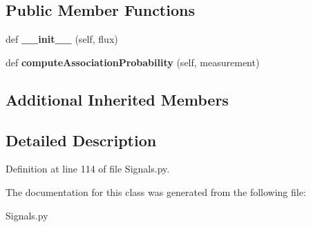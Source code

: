 \subsection*{Public Member Functions}
\begin{DoxyCompactItemize}
\item 
def {\bfseries \+\_\+\+\_\+init\+\_\+\+\_\+} (self, flux)\hypertarget{classSignals_1_1StaticPoissonSource_a71ff9a86dc2d7e1a89e5f40e0de5f20e}{}\label{classSignals_1_1StaticPoissonSource_a71ff9a86dc2d7e1a89e5f40e0de5f20e}

\item 
def {\bfseries compute\+Association\+Probability} (self, measurement)\hypertarget{classSignals_1_1StaticPoissonSource_a61351ebf4f75f28e227cfee7ca7e5d64}{}\label{classSignals_1_1StaticPoissonSource_a61351ebf4f75f28e227cfee7ca7e5d64}

\end{DoxyCompactItemize}
\subsection*{Additional Inherited Members}


\subsection{Detailed Description}


Definition at line 114 of file Signals.\+py.



The documentation for this class was generated from the following file\+:\begin{DoxyCompactItemize}
\item 
Signals.\+py\end{DoxyCompactItemize}
